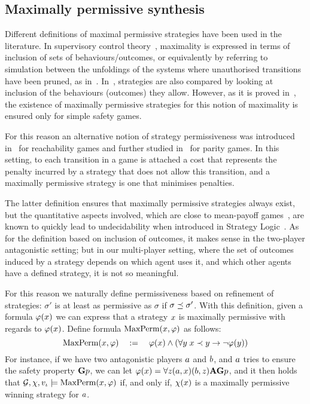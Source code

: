 \subsection{Maximally permissive synthesis}
\label{sec-max-perm}

Different definitions of maximal permissive strategies have been used
in the literature. In supervisory control
theory~\cite{ramadge1987supervisory}, maximality is expressed in terms
of inclusion of sets of behaviours/outcomes, or equivalently by
referring to simulation between the unfoldings of the systems where
unauthorised transitions have been pruned, as
in~\cite{pinchinat2005you}.  In~\cite{bernet2002permissive},
strategies are also compared by looking at inclusion of the behaviours
(outcomes) they allow. However, as it is proved
in~\cite{bernet2002permissive}, the existence of maximally permissive
strategies for this notion of maximality is ensured only for simple
safety games.

For this reason an alternative notion of strategy
permissiveness was introduced in~\cite{bouyer2009measuring} for
reachability games and further studied in~\cite{bouyer2011measuring}
for parity games. In this setting, to each transition in a game is
attached a cost that represents the penalty incurred by a strategy
that does not allow this transition, and a maximally permissive
strategy is one that minimises penalties.

The latter definition ensures that
maximally permissive strategies always exist, but the quantitative
aspects involved, which are close to mean-payoff
games~\cite{ehrenfeucht1979positional,gurvich1988cyclic}, are known to
quickly lead to undecidability when introduced in Strategy Logic~\cite{gardy2017semantics}.
As for the definition based on inclusion of outcomes, it makes sense in the
two-player antagonistic setting; but in our multi-player setting, where the set of
outcomes induced by a strategy depends on which agent uses it, and
which other agents have a defined strategy, it is not so meaningful.

For this reason we naturally define permissiveness based on refinement
of strategies: $\sigma'$ is at least as permissive as $\sigma$ if $\sigma\refines\sigma'$.
With this definition, given a formula $\phi(\var)$ we can express that a strategy $\var$
  is maximally permissive with regards to  $\phi(\var)$. Define formula $\maxperm(\var,\phi)$ as
  follows:
  \[\maxperm(\var,\phi) \quad := \quad \phi(\var) \wedge (\forall \varb \;
    \var \refinesstr \varb \impl \neg \phi(\varb))\]
  For instance, if we have two antagonistic players $\ag$ and $\agb$,
  and $\ag$ tries to ensure the safety property $\always p$, we can let $\phi(\var)=\forall \varc
  \bind[\ag]{\var}\bind[\agb]{\varc}\A\always p$, and it then holds that
  $\CGS,\assign,\pos_\init\models \maxperm(\var,\phi)$ if, and only
  if, $\assign(\var)$ is a maximally permissive winning strategy for $\ag$.

